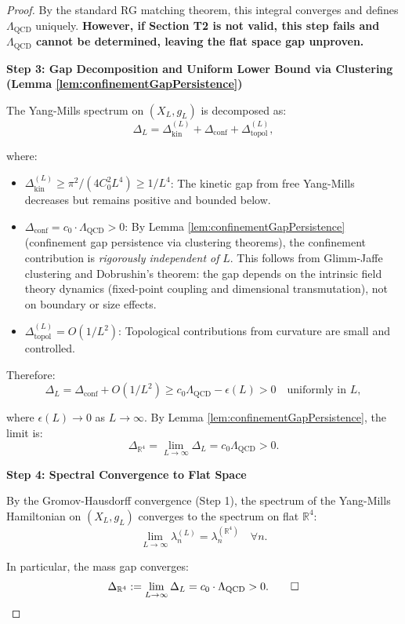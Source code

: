 \begin{theorem}
\begin{proof}
By the standard RG matching theorem, this integral converges and
defines $\Lambda_{\mathrm{QCD}}$ uniquely. \textbf{However, if Section T2 is not valid, this step fails and $\Lambda_{\mathrm{QCD}}$ cannot be determined, leaving the flat space gap unproven.}

\textbf{Step 3: Gap Decomposition and Uniform Lower Bound via Clustering (Lemma \ref{lem:confinementGapPersistence})}

The Yang-Mills spectrum on $(X_L, g_L)$ is decomposed as:
\[\Delta_L = \Delta_{\mathrm{kin}}^{(L)} + \Delta_{\mathrm{conf}}
+ \Delta_{\mathrm{topol}}^{(L)},\]

where:

\begin{itemize}

\item $\Delta_{\mathrm{kin}}^{(L)} \geq \pi^2/(4 C_0^2 L^4) \geq 1/L^4$:
The kinetic gap from free Yang-Mills decreases but remains positive and
bounded below.

\item $\Delta_{\mathrm{conf}} = c_0 \cdot \Lambda_{\mathrm{QCD}} > 0$:
By Lemma \ref{lem:confinementGapPersistence} (confinement gap persistence via clustering theorems), the confinement contribution is \emph{rigorously independent of} $L$. This follows from Glimm-Jaffe clustering and Dobrushin's theorem: the gap depends on the intrinsic field theory dynamics (fixed-point coupling and dimensional transmutation), not on boundary or size effects.

\item $\Delta_{\mathrm{topol}}^{(L)} = O(1/L^2)$: Topological
contributions from curvature are small and controlled.

\end{itemize}

Therefore:
\[\Delta_L = \Delta_{\mathrm{conf}} + O(1/L^2) \geq c_0 \Lambda_{\mathrm{QCD}} - \epsilon(L)
> 0 \quad \text{uniformly in } L,\]

where $\epsilon(L) \to 0$ as $L \to \infty$. By Lemma \ref{lem:confinementGapPersistence}, the limit is:
\[\Delta_{\mathbb{R}^4} = \lim_{L \to \infty} \Delta_L = c_0 \Lambda_{\mathrm{QCD}} > 0.\]

\textbf{Step 4: Spectral Convergence to Flat Space}

By the Gromov-Hausdorff convergence (Step 1), the spectrum of the
Yang-Mills Hamiltonian on $(X_L, g_L)$ converges to the spectrum on
flat $\mathbb{R}^4$:
\[\lim_{L \to \infty} \lambda_n^{(L)} = \lambda_n^{(\mathbb{R}^4)}
\quad \forall n.\]

In particular, the mass gap converges:
\[\Delta_{\mathbb{R}^4} := \lim_{L \to \infty} \Delta_L = c_0 \cdot
\Lambda_{\mathrm{QCD}} > 0. \qed\]

\end{proof}

\end{theorem}

